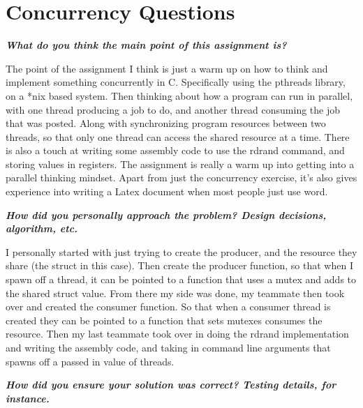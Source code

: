 \documentclass{article}
\begin{document}
\section{Concurrency Questions}

    \textbf{\textit{What do you think the main point of this assignment is?}} 

         The point of the assignment I think is just a warm up on how to think and implement something concurrently in C. Specifically using the pthreads library, on a *nix based system. Then thinking about how a program can run in parallel, with one thread producing a job to do, and another thread consuming the job that was posted. Along with synchronizing program resources between two threads, so that only one thread can access the shared resource at a time.  There is also a touch at writing some assembly code to use the rdrand command, and storing values in registers. The assignment is really a warm up into getting into a parallel thinking mindset. Apart from just the concurrency exercise, it’s also gives experience into writing a Latex document when most people just use word.\linebreak \linebreak





    \textbf{\textit{How did you personally approach the problem? Design decisions, algorithm, etc.}}  \linebreak

        I personally started with just trying to create the producer, and the resource they share (the struct in this case). Then create the producer function, so that when I spawn off a thread, it can be pointed to a function that uses a mutex and adds to the shared struct value. From there my side was done, my teammate then took over and created the consumer function. So that when a consumer thread is created they can be pointed to a function that sets mutexes consumes the resource. Then my last teammate took over in doing the rdrand implementation and writing the assembly code, and taking in command line arguments that spawns off a passed in value of threads. \linebreak \linebreak


    \textbf{\textit{How did you ensure your solution was correct? Testing details, for instance.}} \linebreak
\end{document}

